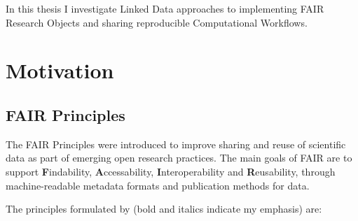 In this thesis I investigate Linked Data approaches to implementing FAIR Research Objects and sharing reproducible Computational Workflows.

\section{Motivation}

\subsection{FAIR Principles}

The FAIR Principles \cite{Wilkinson 2016} were introduced to improve sharing and reuse of scientific data as part of emerging open research practices. The main goals of FAIR are to support \textbf{F}indability, \textbf{A}ccessability, \textbf{I}nteroperability and \textbf{R}eusability, through machine-readable metadata formats and publication methods for data.

The principles formulated by \cite{Wilkinson 2016} (bold and italics indicate my emphasis) are:

